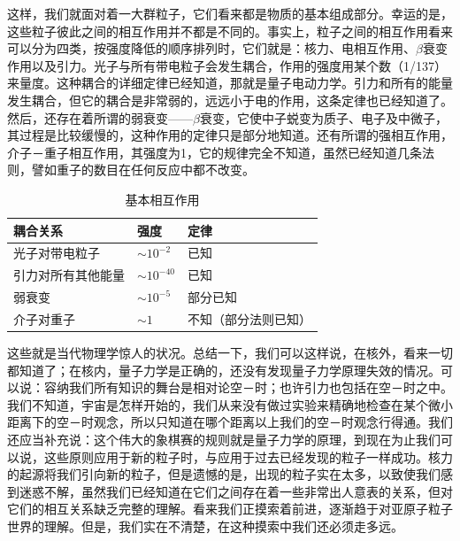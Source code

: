 这样，我们就面对着一大群粒子，它们看来都是物质的基本组成部分。幸运的是，这些粒子彼此之间的相互作用并不都是不同的。事实上，粒子之间的相互作用看来可以分为四类，按强度降低的顺序排列时，它们就是：核力、电相互作用、$\beta$衰变作用以及引力。光子与所有带电粒子会发生耦合，作用的强度用某个数（1/137）来量度。这种耦合的详细定律已经知道，那就是量子电动力学。引力和所有的能量发生耦合，但它的耦合是非常弱的，远远小于电的作用，这条定律也已经知道了。然后，还存在着所谓的弱衰变——$\beta$衰变，它使中子蜕变为质子、电子及中微子，其过程是比较缓慢的，这种作用的定律只是部分地知道。还有所谓的强相互作用，介子－重子相互作用，其强度为1，它的规律完全不知道，虽然已经知道几条法则，譬如重子的数目在任何反应中都不改变。

\begin{table}[H]
    \centering
    \label{tab:基本相互作用}
    \caption{基本相互作用}
    \medskip 
    \begin{tabular}{@{}lll@{}}
        \toprule
        耦合关系      & 强度             & 定律         \\ \midrule
        光子对带电粒子   & $\sim10^{-2}$  & 已知         \\
        引力对所有其他能量 & $\sim10^{-40}$ & 已知         \\
        弱衰变       & $\sim10^{-5}$  & 部分已知       \\
        介子对重子     & $\sim1$        & 不知（部分法则已知） \\ \bottomrule
    \end{tabular}
\end{table}

这些就是当代物理学惊人的状况。总结一下，我们可以这样说，在核外，看来一切都知道了；在核内，量子力学是正确的，还没有发现量子力学原理失效的情况。可以说：容纳我们所有知识的舞台是相对论空－时；也许引力也包括在空－时之中。我们不知道，宇宙是怎样开始的，我们从来没有做过实验来精确地检查在某个微小距离下的空－时观念，所以只知道在哪个距离以上我们的空－时观念行得通。我们还应当补充说：这个伟大的象棋赛的规则就是量子力学的原理，到现在为止我们可以说，这些原则应用于新的粒子时，与应用于过去已经发现的粒子一样成功。核力的起源将我们引向新的粒子，但是遗憾的是，出现的粒子实在太多，以致使我们感到迷惑不解，虽然我们已经知道在它们之间存在着一些非常出人意表的关系，但对它们的相互关系缺乏完整的理解。看来我们正摸索着前进，逐渐趋于对亚原子粒子世界的理解。但是，我们实在不清楚，在这种摸索中我们还必须走多远。
